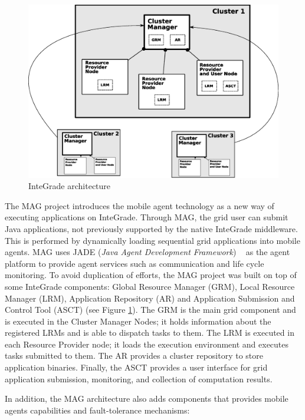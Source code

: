 \documentclass{sig-alternate}
\begin{document}
\begin{figure}[th]
\centering \includegraphics[width=1\columnwidth]{images/integrade2_ieee.eps}
\caption{InteGrade architecture}
\label{fig:integrade}
\end{figure}

The MAG project \cite{lopes05} introduces the mobile agent technology as a new way
of executing applications on InteGrade. Through MAG, the grid user can submit
Java applications, not previously supported by the native InteGrade middleware. This is
performed by dynamically loading sequential grid applications into mobile
agents. MAG uses JADE (\emph{Java Agent Development Framework}) ~\cite{jade} as the agent
platform to provide agent services such as communication and life cycle
monitoring. 
To avoid duplication of efforts, the MAG project was built on top of
some InteGrade components: Global Resource Manager (GRM), Local Resource
Manager (LRM), Application Repository (AR) and Application Submission and
Control Tool (ASCT) (see Figure \ref{fig:integrade}). 
The GRM is the main grid component and is executed
in the Cluster Manager Nodes; it holds information about the registered
LRMs and is able to dispatch tasks to them. The LRM is executed in
each Resource Provider node; it loads the execution environment and
executes tasks submitted to them. The AR provides a cluster repository to
store application binaries. Finally, the ASCT provides a user interface for grid application submission,  
monitoring, and collection of computation results.

In addition, the MAG architecture also adds components that provides
mobile agents capabilities and fault-tolerance mechanisms:
\end{document}
